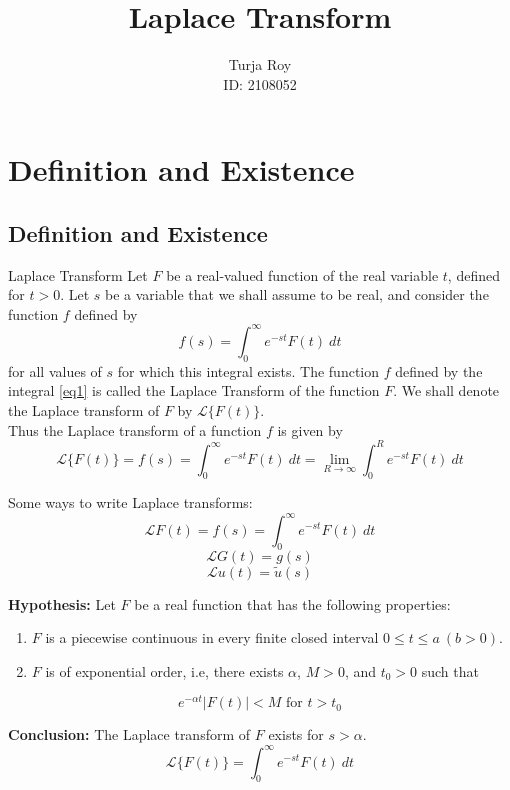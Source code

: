 \documentclass[12pt]{article}
\title{
    \textbf{Laplace Transform}
}
\author{
    Turja Roy\\
    ID: 2108052
}
\date{}
\newcommand{\Lap}{\mathscr{L}}
\begin{document}
\maketitle
\tableofcontents
\newpage


\section{Definition and Existence}


\subsection{Definition and Existence}

\begin{definition}{Laplace Transform}{}
    Let $F$ be a real-valued function of the real variable $t$, defined for $t>0$. Let $s$ be a variable that we shall assume to be real, and consider the function $f$ defined by
    \begin{equation} \label{eq1}
        f(s) = \int_{0}^{\infty} {e^{-st} F(t)} \: d{t} 
    \end{equation}
    for all values of $s$ for which this integral exists. The function $f$ defined by the integral \eqref{eq1} is called the Laplace Transform of the function $F$. We shall denote the Laplace transform of $F$ by $\Lap\{F(t)\}$.\\
    Thus the Laplace transform of a function $f$ is given by
    \begin{equation} \label{eq2}
        \Lap\{ F(t) \} = f(s) = \int_{0}^{\infty} {e^{-st} F(t)} \: d{t}  = \lim_{R \to \infty} \int_{0}^{R} {e^{-st} F(t)} \: d{t} 
    \end{equation}
\end{definition}

Some ways to write Laplace transforms:\\
\[ \Lap{F(t)} = f(s) = \int_{0}^{\infty} { e^{-st} F(t) } \: d{t} \]
\[ \Lap{G(t)} = g(s) \]
\[ \Lap{u(t)} = \tilde{u}(s) \]

\vspace{30pt}
\begin{theorem}{}{}
    \textbf{Hypothesis: } Let $F$ be a real function that has the following properties:
    \begin{enumerate}
        \item $F$ is a piecewise continuous in every finite closed interval $0 \le t \le a \: (b>0)$.
        \item $F$ is of exponential order, i.e, there exists $\alpha$, $M>0$, and $t_0>0$ such that
    \end{enumerate}
    \[ e^{-\alpha t}|F(t)| < M \text{ for } t>t_0 \]
    
    \textbf{Conclusion: } The Laplace transform of $F$ exists for $s>\alpha$.
    \[
        \Lap \{ F(t) \} = \int_{0}^{\infty} {e^{-s t}F(t)} \: d{t}
    \] 
\end{theorem}
\end{document}
